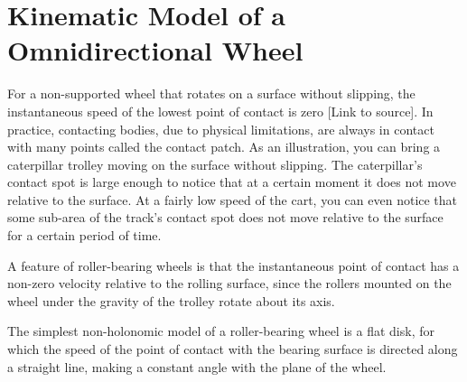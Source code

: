 \documentclass[oneside,final,14pt]{extreport}
\newcommand{\cmmnt}[1]{\ignorespaces}
\begin{document}
\iffalse
In ref, the dynamic model of a trolley with N roller-bearing wheels is considered in more detail. The model of the trolley is built on the assumption that the model of the roller-bearing wheel is a solid disk, the speed of the lowest point of which is perpendicular to the direction of the axis of the roller at this point. In addition, the controllability criterion of such a model is considered, from which a number of restrictions on its design follow. For example, if the sum of the angle of the axis of the roller and the angle of rotation of the wheel of all roller-bearing wheels is equal, then such a model cannot move along an arbitrary trajectory. If these angles at the two wheels coincide, then a pair of wheels can be taken as one virtual wheel with the radius vector $ r_{ij} = r_{i} - r_{j} $ in the local coordinate system and the moment $ T_{ij} = T_{i} + T_{j} $.
\fi
\chapter{Kinematic Model of a Omnidirectional Wheel}
For a non-supported wheel that rotates on a surface without slipping, the instantaneous speed of the lowest point of contact is zero [Link to source]. In practice, contacting bodies, due to physical limitations, are always in contact with many points called the contact patch. As an illustration, you can bring a caterpillar trolley moving on the surface without slipping. The caterpillar’s ​​contact spot is large enough to notice that at a certain moment it does not move relative to the surface. At a fairly low speed of the cart, you can even notice that some sub-area of ​​the track’s contact spot does not move relative to the surface for a certain period of time.

A feature of roller-bearing wheels is that the instantaneous point of contact has a non-zero velocity relative to the rolling surface, since the rollers mounted on the wheel under the gravity of the trolley rotate about its axis. \cmmnt{In the case of an omnidirectional wheel whose roller axes are parallel to the plane of the wheel disc, slipping does not occur, which simplifies the process of constructing a mathematical model}

 The simplest non-holonomic model of a roller-bearing wheel is a flat disk, for which the speed of the point of contact with the bearing surface is directed along a straight line, making a constant angle with the plane of the wheel.

\begin{figure} [H]
\end{figure}
\end{document}
